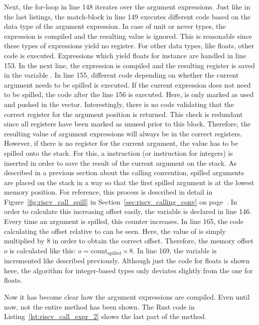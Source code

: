 Next, the for-loop in line 148 iterates over the argument expressions.
Just like in the last listings, the match-block in line 149 executes different code based on the data type of the argument expression.
In case of unit or never types, the expression is compiled and the resulting value is ignored.
This is reasonable since these types of expressions yield no register.
For other data types, like floats, other code is executed.
Expressions which yield floats for instance are handled in line 153.
In the next line, the expression is compiled and the resulting register is saved in the variable .
In line 155, different code depending on whether the current argument needs to be spilled is executed.
If the current expression does not need to be spilled, the code after the line 156 is executed.
Here,  is only marked as used and pushed in the  vector.
Interestingly, there is no code validating that the correct register for the argument position is returned.
This check is redundant since all registers have been marked as unused prior to this block.
Therefore, the resulting value of argument expressions will always be in the correct registers.
However, if there is no register for the current argument, the value has to be spilled onto the stack.
For this, a  instruction (or  instruction for integers) is inserted in order to save the result of the current argument on the stack.
As described in a previous section about the \riscv{} calling convention, spilled arguments are placed on the stack in a way so that the first spilled argument is at the lowest memory position.
For reference, this process is described in detail in Figure~\ref{fig:riscv_call_spill} in Section~\ref{sec:riscv_calling_conv} on page~\pageref{sec:riscv_calling_conv}.
In order to calculate this increasing offset easily, the  variable is declared in line 146.
Every time an argument is spilled, this counter increases.
In line 165, the code calculating the offset relative to  can be seen.
Here, the value of  is simply multiplied by 8 in order to obtain the correct offset.
Therefore, the memory offset $o$ is calculated like this: $o = \text{count}_\text{spilled} \times 8$.
In line 169, the  variable is incremented like described previously.
Although just the code for floats is shown here, the algorithm for integer-based types only deviates slightly from the one for floats.

Now it has become clear how the argument expressions are compiled.
Even until now, not the entire method has been shown.
The Rust code in Listing~\ref{lst:riscv_call_expr_2} shows the last part of the method.

